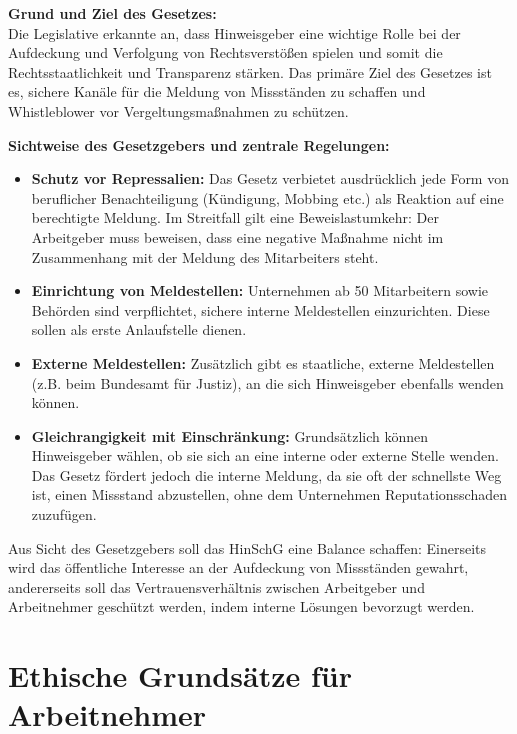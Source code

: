 \documentclass[
    12pt,               %
    a4paper,            %
    ngerman             %
]{scrartcl}
\begin{document}
\begin{description}
    \item\textbf{Grund und Ziel des Gesetzes:}\\ Die Legislative erkannte an, dass Hinweisgeber eine wichtige Rolle bei der Aufdeckung und Verfolgung von Rechtsverstößen spielen und somit die Rechtsstaatlichkeit und Transparenz stärken. Das primäre Ziel des Gesetzes ist es, sichere Kanäle für die Meldung von Missständen zu schaffen und Whistleblower vor Vergeltungsmaßnahmen zu schützen.

    \item \textbf{Sichtweise des Gesetzgebers und zentrale Regelungen:}
    \begin{itemize}
        \item \textbf{Schutz vor Repressalien:} Das Gesetz verbietet ausdrücklich jede Form von beruflicher Benachteiligung (Kündigung, Mobbing etc.) als Reaktion auf eine berechtigte Meldung. Im Streitfall gilt eine Beweislastumkehr: Der Arbeitgeber muss beweisen, dass eine negative Maßnahme nicht im Zusammenhang mit der Meldung des Mitarbeiters steht.
        \item \textbf{Einrichtung von Meldestellen:} Unternehmen ab 50 Mitarbeitern sowie Behörden sind verpflichtet, sichere interne Meldestellen einzurichten. Diese sollen als erste Anlaufstelle dienen.
        \item \textbf{Externe Meldestellen:} Zusätzlich gibt es staatliche, externe Meldestellen (z.B. beim Bundesamt für Justiz), an die sich Hinweisgeber ebenfalls wenden können.
        \item \textbf{Gleichrangigkeit mit Einschränkung:} Grundsätzlich können Hinweisgeber wählen, ob sie sich an eine interne oder externe Stelle wenden. Das Gesetz fördert jedoch die interne Meldung, da sie oft der schnellste Weg ist, einen Missstand abzustellen, ohne dem Unternehmen Reputationsschaden zuzufügen.
    \end{itemize}
\end{description}

Aus Sicht des Gesetzgebers soll das HinSchG eine Balance schaffen: Einerseits wird das öffentliche Interesse an der Aufdeckung von Missständen gewahrt, andererseits soll das Vertrauensverhältnis zwischen Arbeitgeber und Arbeitnehmer geschützt werden, indem interne Lösungen bevorzugt werden.

\section{Ethische Grundsätze für Arbeitnehmer}
\end{document}
